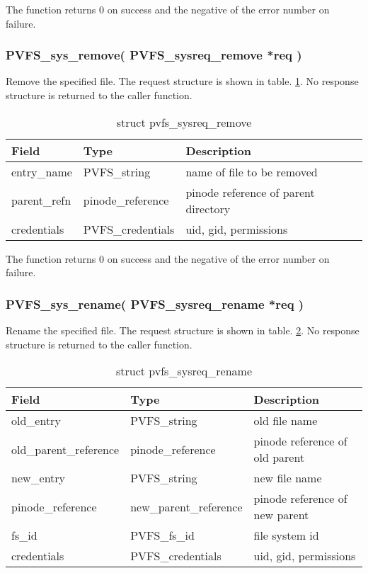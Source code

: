 \documentclass[11pt, letterpaper]{article}
\begin{document}
The function returns 0 on success and the negative of the error
number on failure.

\subsubsection{PVFS\_sys\_remove(
PVFS\_sysreq\_remove *req
)}

Remove the specified file. The request structure is shown in table.
 \ref{tab:reqrem}. No response structure is returned to the caller
function.

\begin{table}[H]
\begin{tabular}{|l|l|l|}
\hline
Field & Type & Description \\
\hline
\hline
entry\_name & PVFS\_string & name of file to be removed \\
\hline
parent\_refn & pinode\_reference & pinode reference of parent directory
\\
credentials & PVFS\_credentials & uid, gid, permissions \\
\hline
\end{tabular}
\caption{struct pvfs\_sysreq\_remove}\label{tab:reqrem}
\end{table}

The function returns 0 on success and the negative of the error
number on failure.

\subsubsection{PVFS\_sys\_rename(
PVFS\_sysreq\_rename *req
)}

Rename the specified file. The request structure is shown in table.
 \ref{tab:reqrename}. No response structure is returned to the caller
function.

\begin{table}[H]
\begin{tabular}{|l|l|l|}
\hline
Field & Type & Description \\
\hline
\hline
old\_entry & PVFS\_string & old file name \\
\hline
old\_parent\_reference & pinode\_reference & pinode reference of old parent \\
\hline
new\_entry & PVFS\_string & new file name \\
\hline
pinode\_reference & new\_parent\_reference & pinode reference of new
parent  \\
\hline
fs\_id & PVFS\_fs\_id & file system id \\
\hline
credentials & PVFS\_credentials & uid, gid, permissions \\
\hline
\end{tabular}
\caption{struct pvfs\_sysreq\_rename}\label{tab:reqrename}
\end{table}
\end{document}
